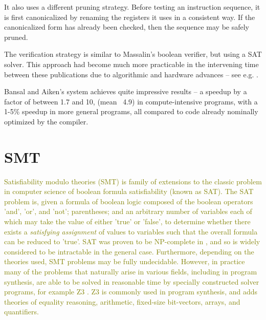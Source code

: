 \documentclass[12pt,twoside]{reedthesis}
\newcommand{\green}[1]{\textcolor{olive}{#1}}
\begin{document}
            It also uses a different pruning strategy.
            Before testing an instruction sequence, it is first canonicalized by renaming the registers it uses in a consistent way.
            If the canonicalized form has already been checked, then the sequence may be safely pruned.
            
            The verification strategy is similar to Massalin's boolean verifier, but using a SAT solver.
            This approach had become much more practicable in the intervening time between these publications due to algorithmic and hardware advances -- see e.g. \cite{silva1996grasp}.
            
            Bansal and Aiken's system achieves quite impressive results -- a speedup by a factor of between 1.7 and 10, (mean ~4.9) in compute-intensive programs, with a 1-5\% speedup in more general programs, all compared to code already nominally optimized by the compiler.

    \section{SMT}
        \green{
        Satisfiability modulo theories (SMT) is family of extensions to the classic problem in computer science of boolean formula satisfiability (known as SAT).
        The SAT problem is, given a formula of boolean logic composed of 
                the boolean operators 'and', 'or', and 'not';
                parentheses;
                and an arbitrary number of variables each of which may take the value of either 'true' or 'false',
            to determine whether there exists a \textit{satisfying assignment} of values to variables such that the overall formula can be reduced to 'true'.
        SAT was proven to be NP-complete in \cite{cook1971sat}, and so is widely considered to be intractable in the general case.
        Furthermore, depending on the theories used, SMT problems may be fully undecidable.
        However, in practice many of the problems that naturally arise in various fields, including in program synthesis, are able to be solved in reasonable time by specially constructed solver programs, for example Z3 \cite{demoura2008z3}.
        Z3 is commonly used in program synthesis, and adds theories of equality reasoning, arithmetic, fixed-size bit-vectors, arrays, and quantifiers.
        }
\end{document}
